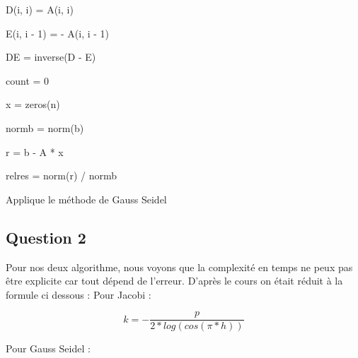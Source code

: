 \documentclass[11pt]{article}
\DeclarePairedDelimiter{\norm}{\lVert}{\rVert}
\begin{document}
\begin{algorithm} [H]
  \SetAlgoLined
  
   {
    D(i, i) = A(i, i) 
  }

   {
    E(i, i - 1) = - A(i, i - 1) 
  }

  DE = inverse(D - E) 

  count = 0 

  x = zeros(n) 

  normb = norm(b) 

  r = b - A * x 

  relres = norm(r) / normb 


  \caption{Applique le méthode de Gauss Seidel}
\end{algorithm}

\subsection{Question 2}

Pour nos deux algorithme, nous voyons que la complexité en temps ne
peux pas être explicite car tout dépend de l'erreur. D'après le cours
on était réduit à la formule ci dessous :\newline
\vspace{5mm}
Pour Jacobi :

\begin{equation*}
  k = - \frac{p}{2 * log(cos(\pi * h))}
\end{equation*}

Pour Gauss Seidel :
\end{document}
